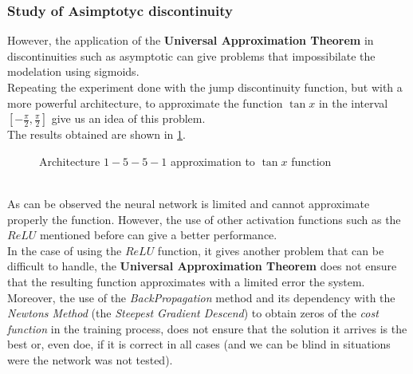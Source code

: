 \documentclass[a4paper, 11pt]{article}
\begin{document}
\subsubsection{Study of Asimptotyc discontinuity}
However, the application of the \textbf{Universal Approximation Theorem} in discontinuities such as asymptotic can give problems that impossibilate the modelation using sigmoids.\\
Repeating the experiment done with the jump discontinuity function, but with a more powerful architecture, to approximate the function $\tan{x}$ in the interval $[-\frac{\pi}{2},\frac{\pi}{2}]$ give us an idea of this problem.\\
The results obtained are shown in \ref{asymp}.
\begin{figure}[h]
    \centering
    \caption{Architecture $1-5-5-1$ approximation to $\tan{x}$ function}
    \label{asymp}
\end{figure}\\
As can be observed the neural network is limited and cannot approximate properly the function. However, the use of other activation functions such as the $ReLU$ mentioned before can give a better performance.\\
In the case of using the $ReLU$ function, it gives another problem that can be difficult to handle, the \textbf{Universal Approximation Theorem} does not ensure that the resulting function approximates with a limited error the system.\\
Moreover, the use of the \textit{BackPropagation} method and its dependency with the \textit{Newtons Method} (the \textit{Steepest Gradient Descend}) to obtain zeros of the \textit{cost function} in the training process, does not ensure that the solution it arrives is the best or, even doe, if it is correct in all cases (and we can be blind in situations were the network was not tested).
\end{document}

